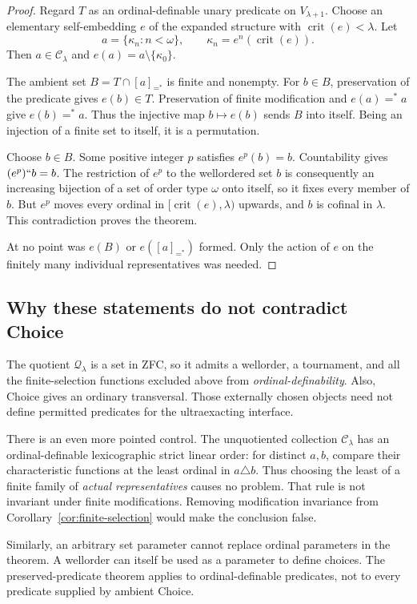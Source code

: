 \documentclass[11pt,letterpaper]{article}
\theoremstyle{definition}
\newcommand{\crit}{\operatorname{crit}}
\newcommand{\CC}{\mathcal C}
\newcommand{\QQ}{\mathcal Q}
\newcommand{\fineq}{\mathrel{=^{*}}}
\begin{document}
\begin{proof}
Regard $T$ as an ordinal-definable unary predicate on $V_{\lambda+1}$. Choose an elementary self-embedding $e$ of the expanded structure with $\crit(e)<\lambda$. Let
\[
 a=\{\kappa_n:n<\omega\},\qquad
 \kappa_n=e^n(\crit(e)).
\]
Then $a\in\CC_\lambda$ and $e(a)=a\setminus\{\kappa_0\}$.

The ambient set $B=T\cap[a]_{=^*}$ is finite and nonempty. For $b\in B$, preservation of the predicate gives $e(b)\in T$. Preservation of finite modification and $e(a)\fineq a$ give $e(b)\fineq a$. Thus the injective map $b\mapsto e(b)$ sends $B$ into itself. Being an injection of a finite set to itself, it is a permutation.

Choose $b\in B$. Some positive integer $p$ satisfies $e^p(b)=b$. Countability gives $(e^p)``b=b$. The restriction of $e^p$ to the wellordered set $b$ is consequently an increasing bijection of a set of order type $\omega$ onto itself, so it fixes every member of $b$. But $e^p$ moves every ordinal in $[\crit(e),\lambda)$ upwards, and $b$ is cofinal in $\lambda$. This contradiction proves the theorem.

At no point was $e(B)$ or $e([a]_{=^*})$ formed. Only the action of $e$ on the finitely many individual representatives was needed.
\end{proof}

\subsection{Why these statements do not contradict Choice}

The quotient $\QQ_\lambda$ is a set in ZFC, so it admits a wellorder, a tournament, and all the finite-selection functions excluded above from \emph{ordinal-definability}. Also, Choice gives an ordinary transversal. Those externally chosen objects need not define permitted predicates for the ultraexacting interface.

There is an even more pointed control. The unquotiented collection $\CC_\lambda$ has an ordinal-definable lexicographic strict linear order: for distinct $a,b$, compare their characteristic functions at the least ordinal in $a\triangle b$. Thus choosing the least of a finite family of \emph{actual representatives} causes no problem. That rule is not invariant under finite modifications. Removing modification invariance from Corollary~\ref{cor:finite-selection} would make the conclusion false.

Similarly, an arbitrary set parameter cannot replace ordinal parameters in the theorem. A wellorder can itself be used as a parameter to define choices. The preserved-predicate theorem applies to ordinal-definable predicates, not to every predicate supplied by ambient Choice.
\end{document}

